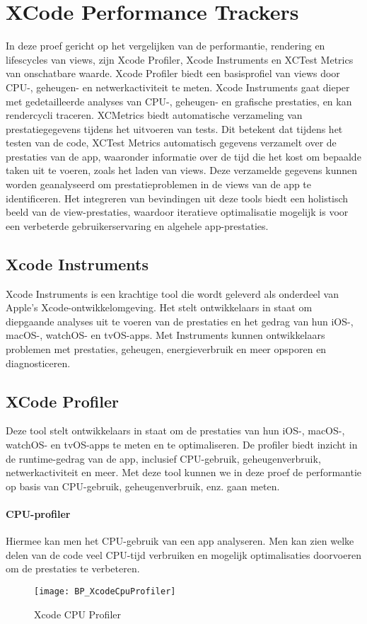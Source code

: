 \section{XCode Performance Trackers}

In deze proef gericht op het vergelijken van de performantie, rendering en lifescycles van views, zijn Xcode Profiler, Xcode Instruments en XCTest Metrics van onschatbare waarde. Xcode Profiler biedt een basisprofiel van views door CPU-, geheugen- en netwerkactiviteit te meten. Xcode Instruments gaat dieper met gedetailleerde analyses van CPU-, geheugen- en grafische prestaties, en kan rendercycli traceren. XCMetrics biedt automatische verzameling van prestatiegegevens tijdens het uitvoeren van tests. Dit betekent dat tijdens het testen van de code, XCTest Metrics automatisch gegevens verzamelt over de prestaties van de app, waaronder informatie over de tijd die het kost om bepaalde taken uit te voeren, zoals het laden van views. Deze verzamelde gegevens kunnen worden geanalyseerd om prestatieproblemen in de views van de app te identificeren. Het integreren van bevindingen uit deze tools biedt een holistisch beeld van de view-prestaties, waardoor iteratieve optimalisatie mogelijk is voor een verbeterde gebruikerservaring en algehele app-prestaties.



\subsection{Xcode Instruments}
Xcode Instruments is een krachtige tool die wordt geleverd als onderdeel van Apple's Xcode-ontwikkelomgeving. Het stelt ontwikkelaars in staat om diepgaande analyses uit te voeren van de prestaties en het gedrag van hun iOS-, macOS-, watchOS- en tvOS-apps. Met Instruments kunnen ontwikkelaars problemen met prestaties, geheugen, energieverbruik en meer opsporen en diagnosticeren. 

\subsection{XCode Profiler}
Deze tool stelt ontwikkelaars in staat om de prestaties van hun iOS-, macOS-, watchOS- en tvOS-apps te meten en te optimaliseren. De profiler biedt inzicht in de runtime-gedrag van de app, inclusief CPU-gebruik, geheugenverbruik, netwerkactiviteit en meer. Met deze tool kunnen we in deze proef de performantie op basis van CPU-gebruik, geheugenverbruik, enz. gaan meten. 
\paragraph{CPU-profiler}
Hiermee kan men het CPU-gebruik van een app analyseren. Men kan zien welke delen van de code veel CPU-tijd verbruiken en mogelijk optimalisaties doorvoeren om de prestaties te verbeteren.
\begin{figure}[H]
    \centering
    \texttt{[image: BP\_XcodeCpuProfiler]} 
    \caption{Xcode CPU Profiler}
    \label{fig:cpuProfiler}
\end{figure}
